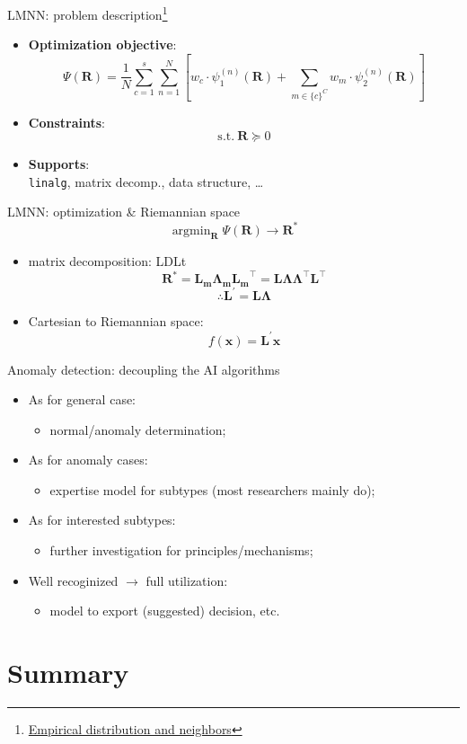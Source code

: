 \documentclass[11pt]{beamer}
\newcommand{\code}[1]{\texttt{#1}}
\newcommand{\uniitem}[1]{\begin{itemize}\item #1 \end{itemize}}
\newcommand{\ftref}[2]{{\color{blue}\footnotesize \href{#1}{#2}}}
\begin{document}
\begin{frame}{LMNN: problem description\footnote[frame]{\ftref{https://informatics.readthedocs.io/en/latest/supplement/supp\_b2.html\#id4}{Empirical distribution and neighbors}}}
	\uniitem{\textbf{Optimization objective}:\\
		\[\Psi (\boldsymbol{R}) = \frac{1}{N} \sum_{c=1}^s \sum_{n=1}^N \left[ w_c \cdot \psi_1^{(n)} (\boldsymbol{R}) + \sum_{m \in \{c\}^C} w_m \cdot \psi_2^{(n)} (\boldsymbol{R}) \right]\]}
	\uniitem{\textbf{Constraints}:\\
		\[ \mathrm{s.t.} \> \boldsymbol{R} \succeq 0 \]}
	\uniitem{\textbf{Supports}:\\
		\code{linalg}, matrix decomp., data structure, \dots}
\end{frame}

\begin{frame}{LMNN: optimization \& Riemannian space}
	\[ \mathop{\arg\min}_{\boldsymbol{R}} \Psi (\boldsymbol{R}) \rightarrow \boldsymbol{R}^* \]
	\uniitem{matrix decomposition: LDLt\\
		\[ \boldsymbol{R}^* =  \boldsymbol{L_m \Lambda_m L_m}^\top =  \boldsymbol{L \Lambda \Lambda}^\top \boldsymbol{ L}^\top\]
		\[ \therefore \boldsymbol{L}^\prime = \boldsymbol{L \Lambda} \]}
	\uniitem{Cartesian to Riemannian space:\\
		\[ f(\boldsymbol{x}) = \boldsymbol{L}^\prime \boldsymbol{x} \]}
\end{frame}

\begin{frame}{Anomaly detection: decoupling the AI algorithms}
	\uniitem{As for general case:
		\uniitem{normal/anomaly determination;}}
	\uniitem{As for anomaly cases:
		\uniitem{expertise model for subtypes (most researchers mainly do);}}
	\uniitem{As for interested subtypes:
		\uniitem{further investigation for principles/mechanisms;}}
	\uniitem{Well recoginized $\rightarrow$ full utilization:
		\uniitem{model to export (suggested) decision, etc.}}
\end{frame}

\section{Summary}
\end{document}
